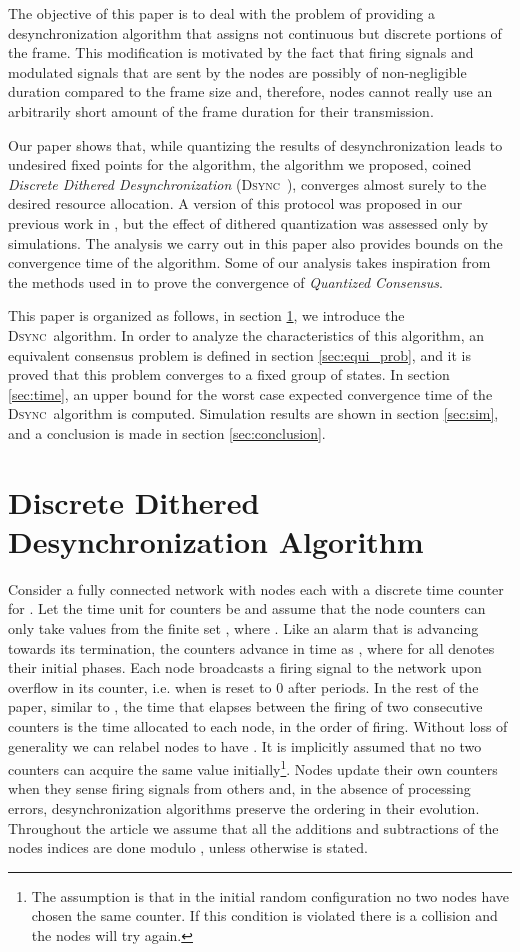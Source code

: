 \documentclass[conference]{IEEEtran}
\newcommand{\DDD}{\textsc{Dsync~}}
\theoremstyle{definition}
\theoremstyle{definition}
\begin{document}
The objective of this paper is to deal with the problem of providing a desynchronization algorithm that assigns not continuous but discrete portions of the frame. This modification is motivated by the fact that firing signals and modulated signals that are sent by the nodes are possibly of non-negligible duration compared to the frame size and, therefore, nodes cannot really use an arbitrarily short amount of the frame duration for their transmission. 

Our paper shows that, while quantizing the results of desynchronization leads to undesired fixed points for the algorithm, the algorithm we proposed, coined \emph{Discrete Dithered Desynchronization} (\DDD), converges almost surely to the desired resource allocation. A version of this protocol
was proposed in our previous work in \cite{PagliariRamy}, but  the effect of dithered quantization was assessed only by simulations.
The analysis we carry out in this paper also provides bounds on the convergence time of the algorithm. Some of our analysis takes inspiration from the methods used in \cite{quant} to prove the convergence of \emph{Quantized Consensus}. 

This paper is organized as follows, in section \ref{sec:DDD}, we introduce the \DDD algorithm. In order to analyze the characteristics of this algorithm, an equivalent consensus problem is defined in section \ref{sec:equi_prob}, and it is proved that this problem converges to a fixed group of states. In section \ref{sec:time}, an upper bound for the worst case expected convergence time of the \DDD algorithm is computed. Simulation results are shown in section \ref{sec:sim}, and a conclusion is made in section \ref{sec:conclusion}.
\section{Discrete Dithered Desynchronization Algorithm}\label{sec:DDD}
Consider a fully connected network  with  nodes each with a discrete time counter  for . Let the time unit for counters be  and assume that the node counters can only take values from the finite set , where .  Like an alarm that is advancing towards its termination, the counters advance in time as , where  for all  denotes their initial phases. 
Each node broadcasts a firing signal to the network upon overflow in its counter, i.e. when  is reset to 0 after  periods. In the rest of the paper, similar to \cite{nagpal}, the time that elapses between the firing of two consecutive counters is the time allocated to each node, in the order of firing. Without loss of generality we can relabel nodes to have . It is implicitly assumed that no two counters can acquire the same value initially\footnote{The assumption is that in the initial random configuration no two nodes have chosen the same counter. If this condition is violated there is a collision and the nodes will try again.}. Nodes update their own counters when they sense firing signals from others and, in the absence of processing errors, desynchronization algorithms preserve the ordering in their evolution. Throughout the article we assume that all the additions and subtractions of the nodes indices are done modulo , unless otherwise is stated. 
\end{document}
